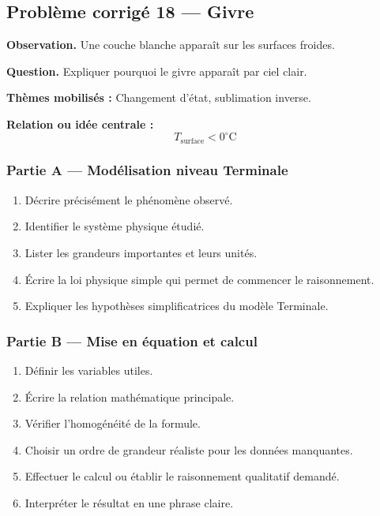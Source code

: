 \documentclass[11pt,a4paper]{article}
\begin{document}
\subsection{Problème corrigé 18 — Givre}

\begin{exercicebox}
\textbf{Observation.} Une couche blanche apparaît sur les surfaces froides.

\medskip
\textbf{Question.} Expliquer pourquoi le givre apparaît par ciel clair.

\medskip
\textbf{Thèmes mobilisés :} Changement d'état, sublimation inverse.

\medskip
\textbf{Relation ou idée centrale :}
\[
T_{\mathrm{surface}}<0^\circ\mathrm C
\]
\end{exercicebox}

\subsubsection*{Partie A — Modélisation niveau Terminale}

\begin{enumerate}
  \item Décrire précisément le phénomène observé.
  \item Identifier le système physique étudié.
  \item Lister les grandeurs importantes et leurs unités.
  \item Écrire la loi physique simple qui permet de commencer le raisonnement.
  \item Expliquer les hypothèses simplificatrices du modèle Terminale.
\end{enumerate}

\subsubsection*{Partie B — Mise en équation et calcul}

\begin{enumerate}
  \item Définir les variables utiles.
  \item Écrire la relation mathématique principale.
  \item Vérifier l'homogénéité de la formule.
  \item Choisir un ordre de grandeur réaliste pour les données manquantes.
  \item Effectuer le calcul ou établir le raisonnement qualitatif demandé.
  \item Interpréter le résultat en une phrase claire.
\end{enumerate}
\end{document}
